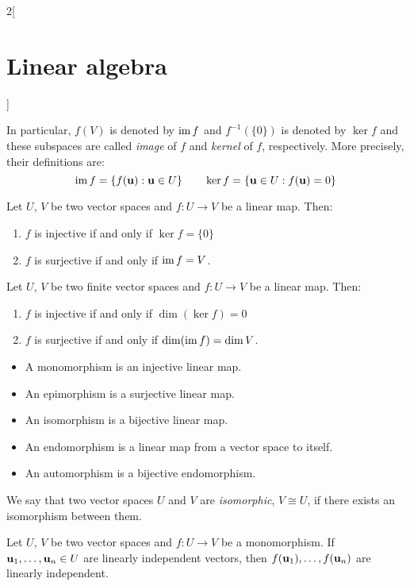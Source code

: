 \documentclass[../../../main.tex]{subfiles}
\begin{document}
\begin{multicols}{2}[\section{Linear algebra}]
\begin{proposition}
    In particular, $f(V)$ is denoted by $\operatorname{im} f$ and $f^{-1}(\{0\})$ is denoted by $\ker f$ and these subspaces are called \emph{image} of $f$ and \emph{kernel} of $f$, respectively. More precisely, their definitions are:
    $$\operatorname{im} f=\{f(\boldsymbol{\mathrm{u}}): \boldsymbol{\mathrm{u}}\in U\}\qquad\ker f=\{\boldsymbol{\mathrm{u}}\in U: f(\boldsymbol{\mathrm{u}})=0\}$$
  \end{proposition}
  \begin{proposition}
    Let $U$, $V$ be two vector spaces and $f:U\rightarrow V$ be a linear map. Then:
    \begin{enumerate}
      \item $f$ is injective if and only if $\ker f=\{0\}$
      \item $f$ is surjective if and only if $\operatorname{im} f=V$.
    \end{enumerate}
  \end{proposition}
  \begin{corollary}
    Let $U$, $V$ be two finite vector spaces and $f:U\rightarrow V$ be a linear map. Then:
    \begin{enumerate}
      \item $f$ is injective if and only if $\dim(\ker f)=0$
      \item $f$ is surjective if and only if $\dim(\operatorname{im} f)=\dim V$.
    \end{enumerate}
  \end{corollary}
  \begin{definition}
    \hfill
    \begin{itemize}
      \item A monomorphism is an injective linear map.
      \item An epimorphism is a surjective linear map.
      \item An isomorphism is a bijective linear map.
      \item An endomorphism is a linear map from a vector space to itself.
      \item An automorphism is a bijective endomorphism.
    \end{itemize}
  \end{definition}
  \begin{definition}
    We say that two vector spaces $U$ and $V$ are \emph{isomorphic}, $V\cong U$, if there exists an isomorphism between them.
  \end{definition}
  \begin{proposition}
    Let $U$, $V$ be two vector spaces and $f:U\rightarrow V$ be a monomorphism. If $\boldsymbol{\mathrm{u}}_1,\ldots,\boldsymbol{\mathrm{u}}_n\in U$ are linearly independent vectors, then $f(\boldsymbol{\mathrm{u}}_1),\ldots,f(\boldsymbol{\mathrm{u}}_n)$  are linearly independent.

\end{proposition}
\end{multicols}
\end{document}
